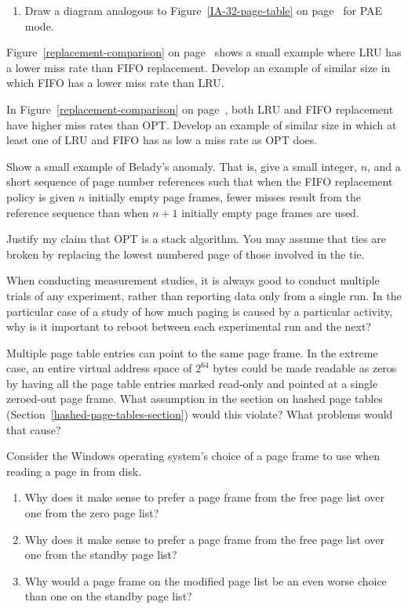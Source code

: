 \begin{chapterEnumerate}
\begin{enumerate}
\item
Draw a diagram analogous to Figure~\ref{IA-32-page-table} on page~\pageref{IA-32-page-table} for PAE mode.
\end{enumerate}
\item\label{FIFO-better-exercise}
Figure~\ref{replacement-comparison} on page~\pageref{replacement-comparison} shows a small example where LRU
has a lower miss rate than FIFO replacement.  Develop an example of
similar size in which FIFO has a lower miss rate than LRU.
\item\label{OPT-tied-exercise}
In Figure~\ref{replacement-comparison} on page~\pageref{replacement-comparison}, both LRU and FIFO replacement
have higher miss rates than OPT.  Develop an example of similar size
in which at least one of LRU and FIFO has as low a miss rate as OPT
does.
\item\label{Belady-exercise}
Show a small example of Belady's anomaly.  That is, give a small
integer, $n$, and a short sequence of page number references such
that when the FIFO replacement policy is given $n$ initially empty
page frames, fewer misses result from the reference sequence than when
$n+1$ initially empty page frames are used.
\item\label{OPT-stack-exercise}
Justify my claim that OPT is a stack algorithm.  You may assume that
ties are broken by replacing the lowest numbered page of those
involved in the tie.
\item
When conducting measurement studies, it is always good to conduct
multiple trials of any experiment, rather than reporting data only
from a single run.  In the particular case of a study of how much paging
is caused by a particular activity, why is it important to reboot between
each experimental run and the next?
\item
Multiple page table entries can point to the same page frame.  In the extreme case, an entire virtual address space of $2^{64}$ bytes could be made readable as zeros by having all the page table entries marked read-only and pointed at a single zeroed-out page frame.  What assumption in the section on hashed page tables (Section~\ref{hashed-page-tables-section}) would this violate?  What problems would that cause?
\item
Consider the Windows operating system's choice of a page frame to use when reading a page in from disk.
\begin{enumerate}
\item Why does it make sense to prefer a page frame from the free page list over one from the zero page list?
\item Why does it make sense to prefer a page frame from the free page list over one from the standby page list?
\item Why would a page frame on the modified page list be an even worse choice than one on the standby page list?
\end{enumerate}
\end{chapterEnumerate}

